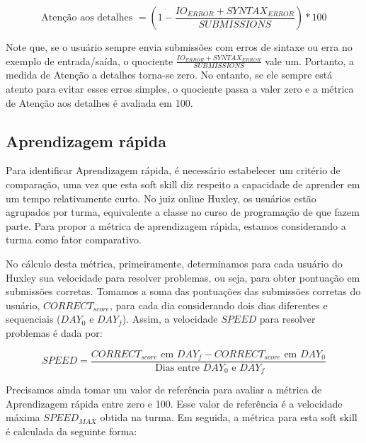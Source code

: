 \begin{equation} \label{m:atencao}
\mbox{Atenção aos detalhes } = \left(1 - \frac {IO_{ERROR} + SYNTAX_{ERROR}}{SUBMISSIONS}\right) * 100
\end{equation}

Note que, se o usuário sempre envia submissões com erros de sintaxe ou erra no exemplo de entrada/saída, o quociente 
$\frac {IO_{ERROR} + SYNTAX_{ERROR}}{SUBMISSIONS}$ vale um. Portanto, a medida de Atenção a detalhes torna-se zero.
No entanto, se ele sempre está atento para evitar esses erros simples, o quociente passa a valer zero e a métrica de Atenção aos detalhes é avaliada em 100.

\subsection{Aprendizagem rápida}

Para identificar Aprendizagem rápida, é necessário estabelecer um critério de comparação, uma vez que esta soft skill diz respeito a capacidade de aprender em um tempo relativamente curto. No juiz online Huxley, os usuários estão agrupados por turma, equivalente a classe no curso de programação de que fazem parte. Para propor a métrica de aprendizagem rápida, estamos considerando a turma como fator comparativo.

No cálculo desta métrica, primeiramente, determinamos para cada usuário do Huxley sua velocidade para resolver problemas, ou seja, para obter pontuação em submissões corretas. Tomamos a soma das pontuações das submissões corretas do usuário, $CORRECT_{score}$, para cada dia considerando dois dias diferentes e sequenciais ($DAY_0$ e $DAY_f$). Assim, a velocidade $SPEED$ para resolver problemas é dada por:

\begin{equation} \label{m:velocidade}
SPEED = \frac {CORRECT_{score} \mbox{ em } DAY_f - CORRECT_{score} \mbox{ em } DAY_0 }
              { \mbox{ Dias entre } DAY_0 \mbox{ e } DAY_f }
\end{equation}


Precisamos ainda tomar um valor de referência para avaliar a métrica de Aprendizagem rápida entre zero e 100. Esse valor de referência é a velocidade máxima $SPEED_{MAX}$ obtida na turma. Em seguida, a métrica para esta soft skill é calculada da seguinte forma:

